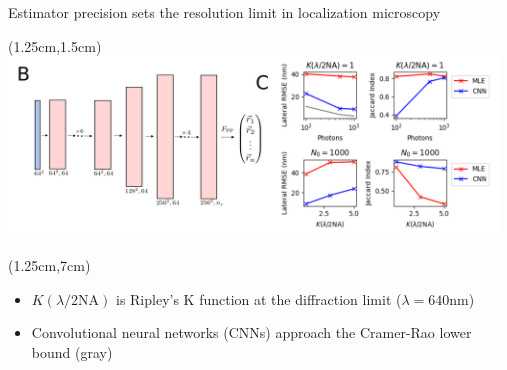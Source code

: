 \documentclass{beamer}					%
\begin{document}
\begin{frame}{Estimator precision sets the resolution limit in localization microscopy}

\begin{textblock*}{10cm}(1.25cm,1.5cm)
\includegraphics[width=13cm]{PSF2D-Crop.png}
\end{textblock*}
\begin{textblock*}{13cm}(1.25cm,7cm)
\begin{itemize}
\item $K(\lambda/2\mathrm{NA})$ is Ripley's K function at the diffraction limit ($\lambda=640\mathrm{nm}$)
\item Convolutional neural networks (CNNs) approach the Cramer-Rao lower bound (gray)
\end{itemize}
\end{textblock*}

\end{frame}
\end{document}
